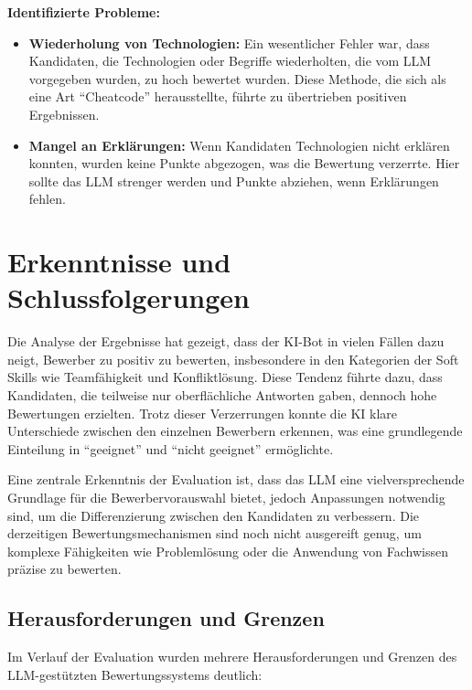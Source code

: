 \textbf{Identifizierte Probleme:}

\begin{itemize}
    \item \textbf{Wiederholung von Technologien:} Ein wesentlicher Fehler war, dass Kandidaten, die Technologien oder Begriffe wiederholten, die vom \ac{LLM} vorgegeben wurden, zu hoch bewertet wurden. Diese Methode, die sich als eine Art ``Cheatcode''  herausstellte, führte zu übertrieben positiven Ergebnissen.
    \item \textbf{Mangel an Erklärungen:} Wenn Kandidaten Technologien nicht erklären konnten, wurden keine Punkte abgezogen, was die Bewertung verzerrte. Hier sollte das \ac{LLM} strenger werden und Punkte abziehen, wenn Erklärungen fehlen.
\end{itemize}

\section{Erkenntnisse und Schlussfolgerungen}

Die Analyse der Ergebnisse hat gezeigt, dass der \acs{KI}-Bot in vielen Fällen dazu neigt, Bewerber zu positiv zu bewerten, insbesondere in den Kategorien der Soft Skills wie Teamfähigkeit und Konfliktlösung. Diese Tendenz führte dazu, dass Kandidaten, die teilweise nur oberflächliche Antworten gaben, dennoch hohe Bewertungen erzielten. Trotz dieser Verzerrungen konnte die \acs{KI} klare Unterschiede zwischen den einzelnen Bewerbern erkennen, was eine grundlegende Einteilung in \enquote{geeignet} und \enquote{nicht geeignet} ermöglichte.

Eine zentrale Erkenntnis der Evaluation ist, dass das \ac{LLM} eine vielversprechende Grundlage für die Bewerbervorauswahl bietet, jedoch Anpassungen notwendig sind, um die Differenzierung zwischen den Kandidaten zu verbessern. Die derzeitigen Bewertungsmechanismen sind noch nicht ausgereift genug, um komplexe Fähigkeiten wie Problemlösung oder die Anwendung von Fachwissen präzise zu bewerten.

\subsection{Herausforderungen und Grenzen}

Im Verlauf der Evaluation wurden mehrere Herausforderungen und Grenzen des \ac{LLM}-gestützten Bewertungssystems deutlich:

